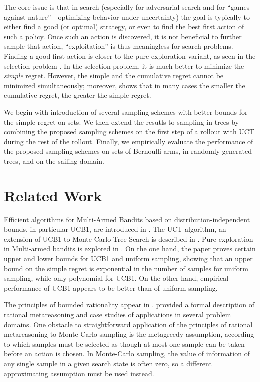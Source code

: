 \documentclass[letterpaper]{article}
\begin{document}
The core issue is that in search (especially for adversarial search
and for ``games against nature'' - optimizing behavior under
uncertainty) the goal is typically to either find a good (or optimal)
strategy, or even to find the best first action of such a policy. Once
such an action is discovered, it is not beneficial to further sample
that action, ``exploitation'' is thus meaningless for search
problems. Finding a good first action is closer to the pure
exploration variant, as seen in the selection problem
\cite{Bubeck.pure,TolpinShimony.blinkered}. In the selection problem,
it is much better to minimize the \emph{simple} regret.  However, the
simple and the cumulative regret cannot be minimized simultaneously;
moreover, \cite{Bubeck.pure} shows that in many cases the smaller the
cumulative regret, the greater the simple regret.

We begin with introduction of several sampling schemes with better
bounds for the simple regret on sets. We then extend the resutls to
sampling in trees by combining the proposed sampling schemes on the
first step of a rollout with UCT during the rest of the
rollout. Finally, we empirically evaluate the performance of the
proposed sampling schemes on sets of Bernoulli arms, in randomly
generated trees, and on the sailing domain.

\section{Related Work}
\label{sec:related-work}

Efficient algorithms for Multi-Armed Bandits based on
distribution-independent bounds, in particular UCB1, are introduced in
\cite{Auer.ucb}. The UCT algorithm, an extension of UCB1 to
Monte-Carlo Tree Search is described in \cite{Kocsis.uct}. Pure
exploration in Multi-armed bandits is explored in
\cite{Bubeck.pure}. On the one hand, the paper proves certain upper
and lower bounds for UCB1 and uniform sampling, showing that an upper
bound on the simple regret is exponential in the number of samples for
uniform sampling, while only polynomial for UCB1. On the other hand,
empirical performance of UCB1 appears to be better than of uniform
sampling. 

The principles of bounded rationality appear in
\cite{Horvitz.reasoningabout}. \cite{Russell.right} provided a formal
description of rational metareasoning and case studies of applications
in several problem domains. One obstacle to straightforward
application of the principles of rational metareasoning to Monte-Carlo
sampling is the metagreedy assumption, according to which samples must
be selected as though at most one sample can be taken before an action
is chosen. In Monte-Carlo sampling, the value of information of any
single sample in a given search state is often zero, so a different
approximating assumption must be used instead.
\end{document}
